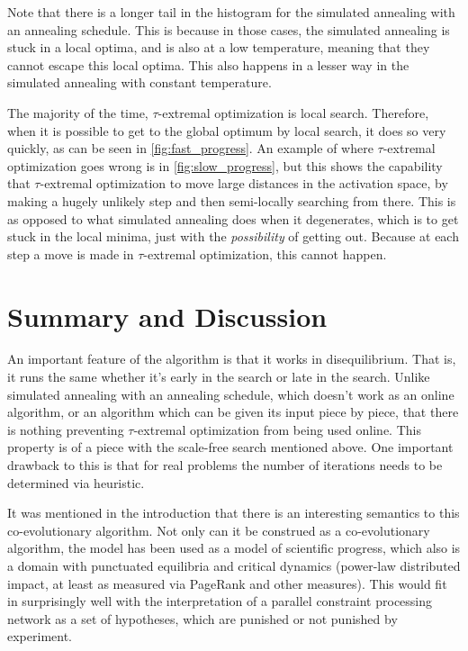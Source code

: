\documentclass[12pt]{article}
\begin{document}
Note that there is a longer tail in the histogram for the simulated annealing with an annealing schedule. This is because in those cases, the simulated annealing is stuck in a local optima, and is also at a low temperature, meaning that they cannot escape this local optima. This also happens in a lesser way in the simulated annealing with constant temperature.

The majority of the time, $\tau$-extremal optimization is local search. Therefore, when it is possible to get to the global optimum by local search, it does so very quickly, as can be seen in \ref{fig:fast_progress}. An example of where $\tau$-extremal optimization goes wrong is in \ref{fig:slow_progress}, but this shows the capability that $\tau$-extremal optimization to move large distances in the activation space, by making a hugely unlikely step and then semi-locally searching from there. This is as opposed to what simulated annealing does when it degenerates, which is to get stuck in the local minima, just with the \emph{possibility} of getting out. Because at each step a move is made in $\tau$-extremal optimization, this cannot happen.

\section{Summary and Discussion}
An important feature of the algorithm is that it works in disequilibrium. That is, it runs the same whether it's early in the search or late in the search. Unlike simulated annealing with an annealing schedule, which doesn't work as an online algorithm, or an algorithm which can be given its input piece by piece, that there is nothing preventing $\tau$-extremal optimization from being used online. This property is of a piece with the scale-free search mentioned above. One important drawback to this is that for real problems the number of iterations needs to be determined via heuristic.

It was mentioned in the introduction that there is an interesting semantics to this co-evolutionary algorithm. Not only can it be construed as a co-evolutionary algorithm, the model has been used as a model of scientific progress, which also is a domain with punctuated equilibria and critical dynamics (power-law distributed impact, at least as measured via PageRank and other measures). This would fit in surprisingly well with the interpretation of a parallel constraint processing network as a set of hypotheses, which are punished or not punished by experiment.
\end{document}
